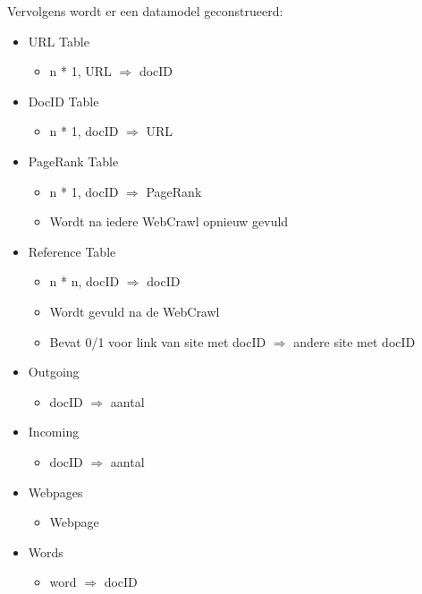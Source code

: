 \documentclass[12pt,a4paper]{article}
\begin{document}
Vervolgens wordt er een datamodel geconstrueerd:
\begin{itemize}
\item URL Table
\begin{itemize}
\item n * 1, URL $\Rightarrow$ docID
\end{itemize}
\item DocID Table
\begin{itemize}
\item n * 1, docID $\Rightarrow$ URL
\end{itemize}
\item PageRank Table
\begin{itemize}
\item n * 1, docID $\Rightarrow$ PageRank
\item Wordt na iedere WebCrawl opnieuw gevuld
\end{itemize}
\item Reference Table
\begin{itemize}
\item n * n, docID $\Rightarrow$ docID
\item Wordt gevuld na de WebCrawl
\item Bevat 0/1 voor link van site met docID $\Rightarrow$ andere site met docID
\end{itemize}
\item Outgoing
\begin{itemize}
\item docID $\Rightarrow$ aantal
\end{itemize}
\item Incoming
\begin{itemize}
\item docID $\Rightarrow$ aantal
\end{itemize}
\item Webpages
\begin{itemize}
\item Webpage
\end{itemize}
\item Words
\begin{itemize}
\item word $\Rightarrow$ docID
\end{itemize}
\end{itemize}
\end{document}
